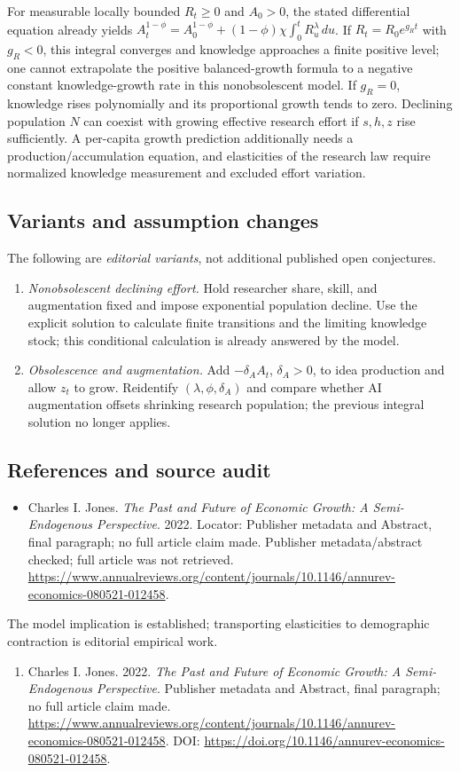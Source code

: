 \documentclass[11pt,a4paper]{article}
\begin{document}
For measurable locally bounded \(R_t\ge0\) and \(A_0>0\), the stated differential equation already yields \(A_t^{1-\phi}=A_0^{1-\phi}+(1-\phi)\chi\int_0^tR_u^\lambda\,du\). If \(R_t=R_0e^{g_Rt}\) with \(g_R<0\), this integral converges and knowledge approaches a finite positive level; one cannot extrapolate the positive balanced-growth formula to a negative constant knowledge-growth rate in this nonobsolescent model. If \(g_R=0\), knowledge rises polynomially and its proportional growth tends to zero. Declining population \(N\) can coexist with growing effective research effort if \(s,h,z\) rise sufficiently. A per-capita growth prediction additionally needs a production/accumulation equation, and elasticities of the research law require normalized knowledge measurement and excluded effort variation.
\subsection*{Variants and assumption changes}
The following are \emph{editorial variants}, not additional published open conjectures.
\begin{enumerate}
\item \emph{Nonobsolescent declining effort.} Hold researcher share, skill, and augmentation fixed and impose exponential population decline. Use the explicit solution to calculate finite transitions and the limiting knowledge stock; this conditional calculation is already answered by the model.
\item \emph{Obsolescence and augmentation.} Add \(-\delta_AA_t\), \(\delta_A>0\), to idea production and allow \(z_t\) to grow. Reidentify \((\lambda,\phi,\delta_A)\) and compare whether AI augmentation offsets shrinking research population; the previous integral solution no longer applies.
\end{enumerate}
\subsection*{References and source audit}
\begin{itemize}
\item Charles I. Jones. \emph{The Past and Future of Economic Growth: A Semi-Endogenous Perspective}. 2022. Locator: Publisher metadata and Abstract, final paragraph; no full article claim made. Publisher metadata/abstract checked; full article was not retrieved. \url{https://www.annualreviews.org/content/journals/10.1146/annurev-economics-080521-012458}.
\end{itemize}
The model implication is established; transporting elasticities to demographic contraction is editorial empirical work.
\begin{enumerate}\raggedright
\item\hypertarget{definitions:source:30007550:1}{} Charles I. Jones. 2022. \emph{The Past and Future of Economic Growth: A Semi-Endogenous Perspective}. Publisher metadata and Abstract, final paragraph; no full article claim made.
\url{https://www.annualreviews.org/content/journals/10.1146/annurev-economics-080521-012458}.
DOI: \url{https://doi.org/10.1146/annurev-economics-080521-012458}.
\end{enumerate}
\end{document}
